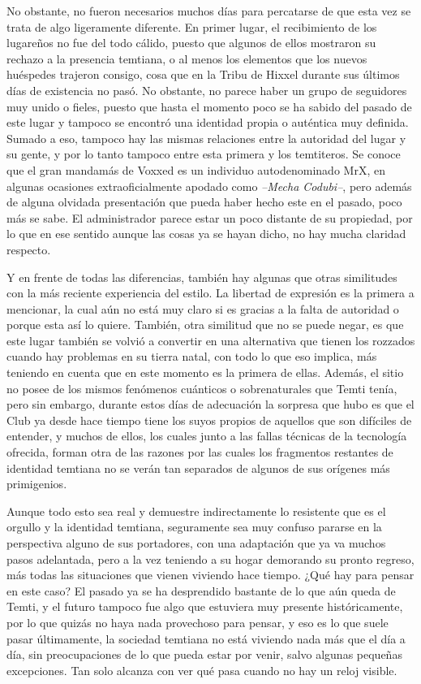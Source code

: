 \documentclass[
  spanish,
]{book}
\begin{document}
No obstante, no fueron necesarios muchos días para percatarse de que esta vez se trata de algo ligeramente diferente.
En primer lugar, el recibimiento de los lugareños no fue del todo cálido, puesto que algunos de ellos mostraron su rechazo a la presencia temtiana, o al menos los elementos que los nuevos huéspedes trajeron consigo, cosa que en la Tribu de Hixxel durante sus últimos días de existencia no pasó. No obstante, no parece haber un grupo de seguidores muy unido o fieles, puesto que hasta el momento poco se ha sabido del pasado de este lugar y tampoco se encontró una identidad propia o auténtica muy definida.
Sumado a eso, tampoco hay las mismas relaciones entre la autoridad del lugar y su gente, y por lo tanto tampoco entre esta primera y los temtiteros. Se conoce que el gran mandamás de Voxxed es un individuo autodenominado MrX, en algunas ocasiones extraoficialmente apodado como \emph{--Mecha Codubi--}, pero además de alguna olvidada presentación que pueda haber hecho este en el pasado, poco más se sabe. El administrador parece estar un poco distante de su propiedad, por lo que en ese sentido aunque las cosas ya se hayan dicho, no hay mucha claridad respecto.

Y en frente de todas las diferencias, también hay algunas que otras similitudes con la más reciente experiencia del estilo.
La libertad de expresión es la primera a mencionar, la cual aún no está muy claro si es gracias a la falta de autoridad o porque esta así lo quiere. También, otra similitud que no se puede negar, es que este lugar también se volvió a convertir en una alternativa que tienen los rozzados cuando hay problemas en su tierra natal, con todo lo que eso implica, más teniendo en cuenta que en este momento es la primera de ellas.
Además, el sitio no posee de los mismos fenómenos cuánticos o sobrenaturales que Temti tenía, pero sin embargo, durante estos días de adecuación la sorpresa que hubo es que el Club ya desde hace tiempo tiene los suyos propios de aquellos que son difíciles de entender, y muchos de ellos, los cuales junto a las fallas técnicas de la tecnología ofrecida, forman otra de las razones por las cuales los fragmentos restantes de identidad temtiana no se verán tan separados de algunos de sus orígenes más primigenios.

Aunque todo esto sea real y demuestre indirectamente lo resistente que es el orgullo y la identidad temtiana, seguramente sea muy confuso pararse en la perspectiva alguno de sus portadores, con una adaptación que ya va muchos pasos adelantada, pero a la vez teniendo a su hogar demorando su pronto regreso, más todas las situaciones que vienen viviendo hace tiempo. ¿Qué hay para pensar en este caso?
El pasado ya se ha desprendido bastante de lo que aún queda de Temti, y el futuro tampoco fue algo que estuviera muy presente históricamente, por lo que quizás no haya nada provechoso para pensar, y eso es lo que suele pasar últimamente, la sociedad temtiana no está viviendo nada más que el día a día, sin preocupaciones de lo que pueda estar por venir, salvo algunas pequeñas excepciones. Tan solo alcanza con ver qué pasa cuando no hay un reloj visible.
\end{document}
